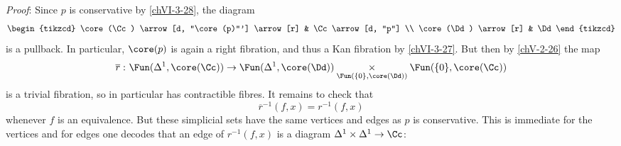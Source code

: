         \emph{Proof}: Since $p$ is conservative by \ref{chVI-3-28}, the diagram
        \begin{equation*}
            \begin{tikzcd}
                \core(\Cc) \arrow[d, "\core(p)"'] \arrow[r] & \Cc \arrow[d, "p"] \\
                \core(\Dd) \arrow[r] & \Dd
            \end{tikzcd}	
        \end{equation*}
        is a pullback. In particular, $\core(p)$ is again a right fibration, and thus a Kan fibration by \ref{chVI-3-27}. But then by \ref{chV-2-26} the map
        \begin{equation*}
            \overline{r} \,\colon \Fun(\Delta^1, \core(\Cc)) \to \Fun(\Delta^1, \core(\Dd)) \underset{\Fun(\{0\}, \core(\Dd))}{\times} \Fun(\{0\}, \core(\Cc))
        \end{equation*}
        is a trivial fibration, so in particular has contractible fibres. It remains to check that
        \begin{equation*}
            \overline{r}^{-1}(f, x) = r^{-1}(f, x)
        \end{equation*}
        whenever $f$ is an equivalence. But these simplicial sets have the same vertices and edges as $p$ is conservative. This is immediate for the vertices and for edges one decodes that an edge of $r^{-1}(f, x)$ is a diagram $\Delta^1 \times \Delta^1 \to \Cc$:

